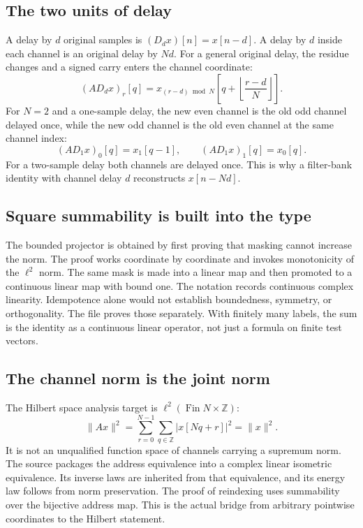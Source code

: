\subsection{The two units of delay}
A delay by $d$ original samples is $(D_dx)[n]=x[n-d]$. A delay by $d$ inside each channel is an original delay by $Nd$. For a general original delay, the residue changes and a signed carry enters the channel coordinate:
\[
(A D_d x)_r[q]
=x_{(r-d)\bmod N}\!\left[q+\left\lfloor\frac{r-d}{N}\right\rfloor\right].
\]
For $N=2$ and a one-sample delay, the new even channel is the old odd channel delayed once, while the new odd channel is the old even channel at the same channel index:
\[
(A D_1x)_0[q]=x_1[q-1],\qquad (A D_1x)_1[q]=x_0[q].
\]
For a two-sample delay both channels are delayed once. This is why a filter-bank identity with channel delay $d$ reconstructs $x[n-Nd]$.

\subsection{Square summability is built into the type}
The bounded projector is obtained by first proving that masking cannot increase the norm. The proof works coordinate by coordinate and invokes monotonicity of the $\ell^2$ norm.
The same mask is made into a linear map and then promoted to a continuous linear map with bound one.
The notation  records continuous complex linearity. Idempotence alone would not establish boundedness, symmetry, or orthogonality. The file proves those separately. With finitely many labels, the sum is the identity as a continuous linear operator, not just a formula on finite test vectors.

\subsection{The channel norm is the joint norm}
The Hilbert space analysis target is $\ell^2(\operatorname{Fin}N\times\mathbb Z)$:
\[
\|Ax\|^2=\sum_{r=0}^{N-1}\sum_{q\in\mathbb Z}|x[Nq+r]|^2=\|x\|^2.
\]
It is not an unqualified function space of channels carrying a supremum norm. The source packages the address equivalence into a complex linear isometric equivalence.
Its inverse laws are inherited from that equivalence, and its energy law follows from norm preservation. The proof of reindexing uses summability over the bijective address map. This is the actual bridge from arbitrary pointwise coordinates to the Hilbert statement.

